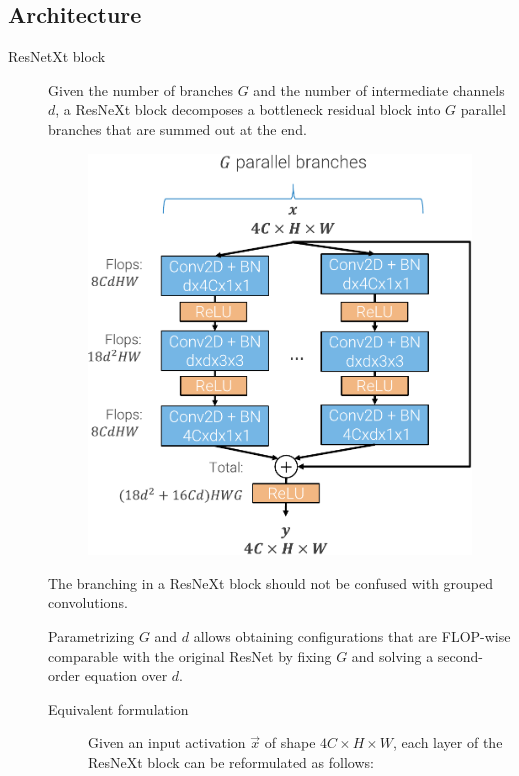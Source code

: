 \subsection{Architecture}

\begin{description}
    \item[ResNetXt block] 
        Given the number of branches $G$ and the number of intermediate channels $d$, a ResNeXt block decomposes a bottleneck residual block into $G$ parallel branches that are summed out at the end.
        \begin{figure}[H]
            \centering
            \includegraphics[width=0.35\linewidth]{./img/_resnext_block.pdf}
        \end{figure}

        \begin{remark}
            The branching in a ResNeXt block should not be confused with grouped convolutions.
        \end{remark}

        \begin{remark}
            Parametrizing $G$ and $d$ allows obtaining configurations that are FLOP-wise comparable with the original ResNet by fixing $G$ and solving a second-order equation over $d$.
        \end{remark}

        \begin{description}
            \item[Equivalent formulation]
                Given an input activation $\vec{x}$ of shape $4C \times H \times W$, each layer of the ResNeXt block can be reformulated as follows:
\end{description}
\end{description}
